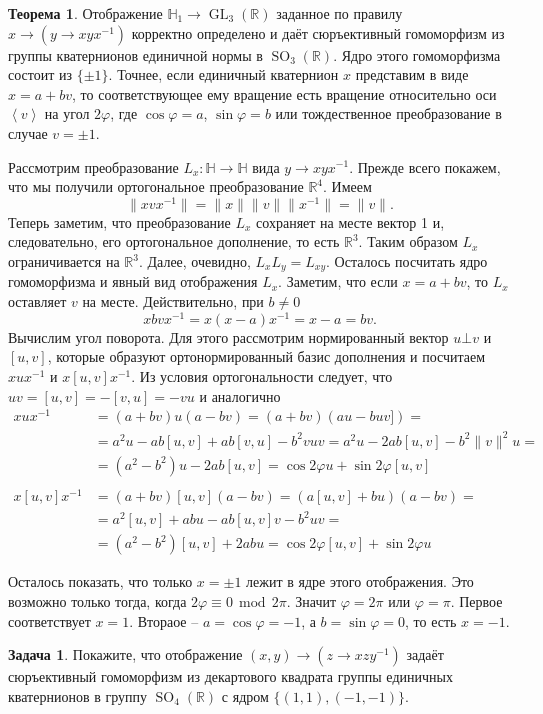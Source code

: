 \documentclass[10pt,a4paper,oneside]{book}
\theoremstyle{definition}
\newtheorem{zad}{\color{violet!100!black}Задача}
\newtheorem{thm}{\color{red!40!black}Теорема}
\renewcommand{\mod}{\,\operatorname{mod}\,}
\newcommand{\mb}[1]{\mathbb{#1}}
\newcommand{\GL}{\operatorname{GL}}
\newcommand{\SO}{\operatorname{SO}}
\def\ffi{\varphi}
\def\lan{\left\langle }
\def\ran{\right\rangle}
\def\thrm{\begin{thm}}
\def\ethrm{\end{thm}}
\def\zd{\begin{zad}}
\def\ezd{\end{zad}}
\begin{document}
\thrm Отображение $\mb H_{1}\to \GL_3(\mb R)$ заданное по правилу $x\to (y \to xyx^{-1})$ корректно определено и даёт сюръективный  гомоморфизм из группы кватернионов единичной нормы в $\SO_3(\mb R)$. Ядро этого гомоморфизма состоит из $\{\pm 1\}$. Точнее, если единичный кватернион $x$  представим в виде $x=a+bv$, то соответствующее ему вращение есть вращение относительно  оси $\lan v \ran$ на угол $2\ffi$, где $\cos \ffi= a$, $\sin \ffi= b$ или тождественное преобразование в случае $v=\pm 1$.
\ethrm
\proof Рассмотрим преобразование $L_x \colon \mb H \to \mb H$ вида $y \to xyx^{-1}$. Прежде всего покажем, что мы получили ортогональное преобразование $\mb R^4$. Имеем
 $$\|xvx^{-1}\|=\|x\| \|v\| \|x^{-1}\| = \|v\|.$$
Теперь заметим, что преобразование $L_x$ сохраняет на месте вектор 1 и, следовательно, его ортогональное дополнение, то есть $\mb R^3$. Таким образом $L_x$ ограничивается на $\mb R^3$. Далее, очевидно, $L_xL_y= L_{xy}$. Осталось посчитать ядро гомоморфизма и явный вид отображения $L_x$. Заметим, что если $x=a+bv$, то $L_x$ оставляет $v$ на месте. Действительно, при $b\neq 0$ 
$$xbvx^{-1}=x(x-a)x^{-1}= x-a=bv.$$
Вычислим угол поворота. Для этого рассмотрим нормированный вектор  $u\bot v$ и $[u,v]$, которые образуют ортонормированный базис дополнения и посчитаем $xux^{-1}$ и $x[u,v]x^{-1}$. Из условия ортогональности следует, что $uv=[u,v]=-[v,u]=-vu$ и аналогично
\begin{align*}
xux^{-1}&=(a+bv)u(a-bv)= (a+bv)(au-buv])=\\
&=a^2u -ab[u,v]+ab[v,u]- b^2vuv=a^2u-2ab[u,v]-b^2\|v\|^2u=\\ &=(a^2-b^2)u-2ab[u,v]=\cos2\ffi u+ \sin 2\ffi [u,v]
\\
\\
x[u,v]x^{-1}&=(a+bv)[u,v](a-bv)= (a[u,v]+bu)(a-bv)=\\
&=a^2[u,v]+abu-ab[u,v]v-b^2uv=\\
&=(a^2-b^2)[u,v]+2abu=\cos 2\ffi[u,v]+\sin 2\ffi u
\end{align*}

Осталось показать, что только $x=\pm 1$ лежит в ядре этого отображения. Это возможно только тогда, когда $2\ffi \equiv 0 \mod 2\pi$. Значит $\ffi=2 \pi$ или $\ffi= \pi$. Первое соответствует $x=1$. Втораое --  $a=\cos \ffi = -1$, а $b=\sin \ffi = 0$, то есть $x=-1$. 
\endproof


\zd
Покажите, что отображение $(x,y) \to (z \to xzy^{-1})$ задаёт сюръективный гомоморфизм из декартового квадрата группы единичных кватернионов в группу $\SO_4(\mb R)$ с ядром $\{(1,1),(-1,-1)\}$.
\ezd
\end{document}
